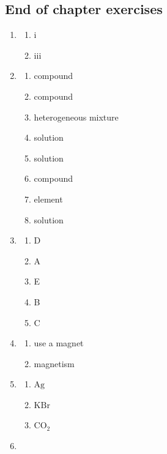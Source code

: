 \subsection{End of chapter exercises} 
\begin{multicols}{3} 
\begin{enumerate}[itemsep=5pt, label=\textbf{\arabic*}. ] 
 \item %
\begin{enumerate}[itemsep=6pt,label=\textbf{(\alph*)}]
\item i
\item iii
\end{enumerate}
\item %
\begin{enumerate}[itemsep=6pt,label=\textbf{(\alph*)}]
\item compound
\item compound
\item heterogeneous mixture
\item solution
\item solution
\item compound
\item element
\item solution
\end{enumerate}
\item %
\begin{enumerate}[itemsep=5pt,label=\textbf{(\alph*)}]
\item D  
\item A
\item E
\item B
\item C
\end{enumerate}
\item %
\begin{enumerate}[itemsep=5pt,label=\textbf{(\alph*)}]
\item use a magnet
\item magnetism
\end{enumerate}
\item %
\begin{enumerate}[itemsep=5pt,label=\textbf{(\alph*)}]
 \item $\text{Ag}$
 \item $\text{KBr}$
 \item $\text{CO}_{2}$
\end{enumerate}
\item %
\begin{enumerate}[itemsep=5pt,label=\textbf{(\alph*)}]

\end{enumerate}
\end{enumerate}
\end{multicols}
